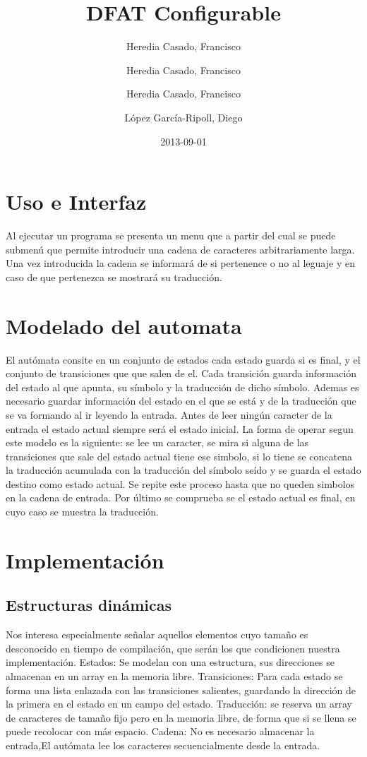 \documentclass{article}
\title{DFAT Configurable}
\date{2013-09-01}
\author{
	Heredia Casado, Francisco\\
	\and
	Heredia Casado, Francisco\\
	\and
	Heredia Casado, Francisco\\
	\and
	López García-Ripoll, Diego\\
}
\begin{document}
\maketitle
\newpage
\section{Uso e Interfaz}
Al ejecutar un programa se presenta un menu que a partir del cual se puede
submenú que permite introducir una cadena de caracteres arbitrariamente larga.
Una vez introducida la cadena se informará de si pertenence o no al leguaje y en
caso de que pertenezca se mostrará su traducción.

\section{Modelado del automata}
El autómata consite en un conjunto de estados cada estado guarda
si es final, y el conjunto de transiciones que que salen de el.
Cada transición guarda información del estado al que apunta,
su símbolo y la traducción de dicho símbolo.
Ademas es necesario guardar información del
estado en el que se está y de la traducción que se va formando al ir leyendo la
entrada. Antes de leer ningún caracter de la entrada el estado actual siempre
será el estado inicial.
La forma de operar segun este modelo es la siguiente:
se lee un caracter, se mira si alguna de las transiciones que sale del estado
actual
tiene ese simbolo, si lo tiene se concatena la traducción acumulada con la
traducción del símbolo seído y se guarda el estado destino como estado actual.
Se repite este proceso hasta que no queden simbolos en la cadena de entrada. Por
último se comprueba se el estado actual es final, en cuyo caso se muestra la
traducción.

\section{Implementación}
\subsection{Estructuras dinámicas}
Nos interesa especialmente señalar aquellos elementos cuyo tamaño es
desconocido en tiempo de compilación, que serán los que condicionen nuestra
implementación.
Estados: Se modelan con una estructura, sus direcciones se almacenan en un array en la memoria libre.
Transiciones: Para cada estado se forma una lista enlazada con las transiciones
salientes, guardando la dirección de la primera en el estado en un campo del
estado.
Traducción: se reserva un array de caracteres de tamaño fijo pero en la memoria libre, de
forma que si se llena se puede recolocar con más espacio.
Cadena: No es necesario almacenar la entrada,El autómata lee los caracteres
secuencialmente desde la entrada.
\end{document}
